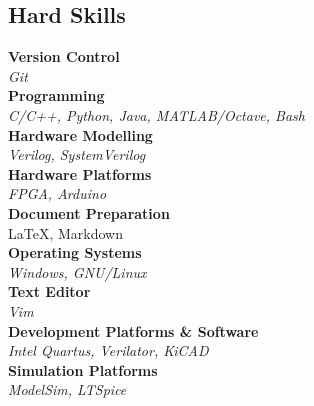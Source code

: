 \documentclass[10pt]{article}
\begin{document}
\begin{multicols}{2}
	\columnbreak

	\section*{\Large{Hard Skills} \hrulefill}

	\textbf{Version Control} \\
	\textit{Git} \\

	\noindent
	\textbf{Programming} \\
	\textit{C/C++, Python, Java, MATLAB/Octave, Bash} \\

	\noindent
	\textbf{Hardware Modelling} \\
	\textit{Verilog, SystemVerilog} \\

	\noindent
	\textbf{Hardware Platforms} \\
	\textit{FPGA, Arduino} \\

	\noindent
	\textbf{Document Preparation} \\
	\LaTeX, Markdown \\

	\noindent
	\textbf{Operating Systems} \\
	\textit{Windows, GNU/Linux} \\

	\noindent
	\textbf{Text Editor} \\
	\textit{Vim} \\

	\noindent
	\textbf{Development Platforms \& Software} \\
	\textit{Intel Quartus, Verilator, KiCAD} \\

	\noindent
	\textbf{Simulation Platforms} \\
	\textit{ModelSim, LTSpice} \\

\end{multicols}
\end{document}
